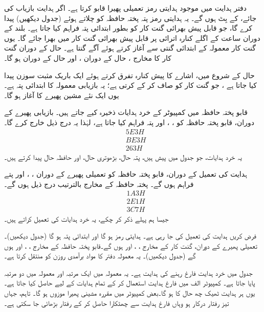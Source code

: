 دفتر ہدایت میں موجود  ہدایتی رمز   تعمیلی پھیرا قابو کرتا ہے۔ اگر  ہدایت  بازیاب کی جائے،  کے بِٹ  ہوں گے۔ یہ ہدایتی رمز پتہ پختہ حافظہ کو چلاتے ہوئے  (جدول  دیکھیں) پیدا کرے گا، جو قابل پیش بھرائی گنت کار کو بطور ابتدائی پتہ   فراہم کیا جاتا ہے۔ بلند  کے دوران ساعت کے اگلے کنارہ اترائی پر   قابل پیش بھرائی گنت کار میں  بھرا جائے گا۔ یوں گنت کار معمولہ  کے  ابتدائی گنتی سے آغاز کرتے ہوئے آگے گنتا ہے۔  حال کے دوران گنت کار کا مخارج ،   حال کے دوران ، اور  حال کے دوران  ہو گا۔

 حال کے   شروع  میں،  اشارے کا   پیش کنارہ تفرق   کرتے ہوئے  ایک  باریک مثبت   سوزن  پیدا کیا جاتا ہے ، جو گنت کار کو صاف کر کے   کرتی  ہے؛ یہ   بازیابی معمولہ  کا ابتدائی پتہ ہے۔ یوں ایک نئے مشین پھیرے کا آغاز ہو گا۔

قابو پختہ حافظہ میں کمپیوٹر کے خرد ہدایات ذخیرہ کیے جاتے ہیں۔ بازیابی پھیرے کے دوران،  قابو پختہ حافظہ  کو ، ، اور  پتہ فراہم کیا جاتا ہے، لہٰذا  یہ درج ذیل خارج کرے گا۔
\begin{align*}
&5E3H\\
&BE3H\\
&263H
\end{align*}
یہ خرد ہدایات، جو جدول  میں پیش ہیں، پتہ حال، بڑھوتری حال، اور حافظہ حال پیدا کرتے ہیں۔

  ہدایت  کی تعمیل کے دوران، قابو پختہ حافظہ کو تعمیلی پھیرے کے دوران ، ، اور  پتے فراہم  ہوں گے۔ پختہ حافظہ کے  مخارج  بالترتیب درج ذیل ہوں گے۔
\begin{align*}
&1A3H\\
&2E1H\\
&3C7H
\end{align*}
جیسا ہم پہلے ذکر کر چکے، یہ خرد ہدایات   کی تعمیل کراتے ہیں۔

فرض کریں  ہدایت کی تعمیل  کی جا رہی ہے۔ ہدایتی رمز  ہو گا اور  ابتدائی پتہ  ہو گا  (جدول  دیکھیں)۔ تعمیلی پھیرے کے دوران،  گنت کار کے مخارج ، ، اور  ہوں گے۔قابو پختہ حافظہ  کے مخارج ، ، اور  ہوں گے (جدول  دیکھیں)۔ یہ معمولہ دفتر  کا مواد برآمدی  روزن  کو منتقل کرتا ہے۔

جدول  میں  خرد ہدایت  فارغ رہنے کی ہدایت ہے۔ یہ   معمولہ میں ایک مرتبہ اور  معمولہ میں دو  مرتبہ  پایا جاتا ہے۔  کمپیوٹر  الف میں فارغ ہدایت  استعمال کر کے تمام ہدایات کے لیے  حاصل کیا جاتا ہے۔یوں ہر ہدایت ٹھیک چھ  حال کا ہو گا۔بعض کمپیوٹر میں   مقررہ مشینی پھیرا موزوں ہو گا۔ تاہم، جہاں تیز رفتار درکار ہو وہاں فارغ  ہدایت  سے چھٹکارا حاصل کر کے رفتار بڑھائی جا سکتی ہے۔


